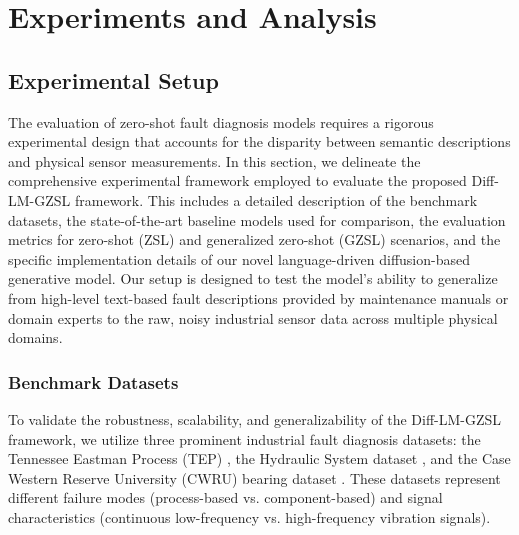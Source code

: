 \section{Experiments and Analysis}
\subsection{Experimental Setup}
\label{sec:setup}
The evaluation of zero-shot fault diagnosis models requires a rigorous experimental design that accounts for the disparity between semantic descriptions and physical sensor measurements. In this section, we delineate the comprehensive experimental framework employed to evaluate the proposed Diff-LM-GZSL framework. This includes a detailed description of the benchmark datasets, the state-of-the-art baseline models used for comparison, the evaluation metrics for zero-shot (ZSL) and generalized zero-shot (GZSL) scenarios, and the specific implementation details of our novel language-driven diffusion-based generative model. Our setup is designed to test the model's ability to generalize from high-level text-based fault descriptions provided by maintenance manuals or domain experts to the raw, noisy industrial sensor data across multiple physical domains.

\subsubsection{Benchmark Datasets}
To validate the robustness, scalability, and generalizability of the Diff-LM-GZSL framework, we utilize three prominent industrial fault diagnosis datasets: the Tennessee Eastman Process (TEP) \cite{Downs1993TEP}, the Hydraulic System dataset \cite{Helwig2015hydraulic}, and the Case Western Reserve University (CWRU) bearing dataset \cite{Smith2015CWRU}. These datasets represent different failure modes (process-based vs. component-based) and signal characteristics (continuous low-frequency vs. high-frequency vibration signals).

